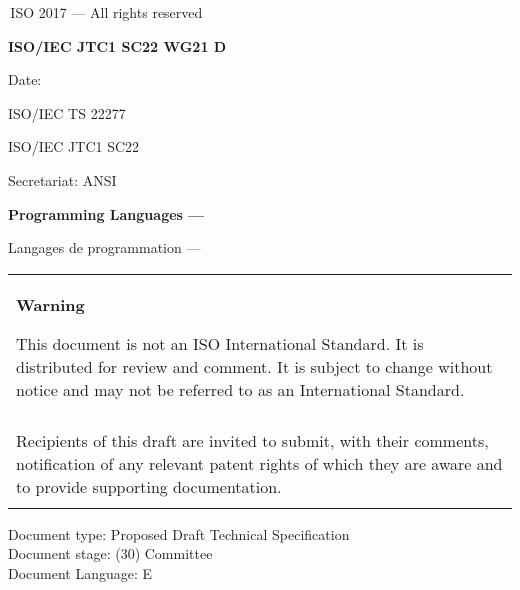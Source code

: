

\thispagestyle{empty}
{\raisebox{.35ex}{\smaller\copyright}}\,ISO 2017 --- All rights reserved
\vspace{2ex}

\begin{flushright}
	\textbf{ISO/IEC JTC1 SC22 WG21 D\,\LARGE\docno} %
	
	Date: \reldate
	
	ISO/IEC TS 22277
	
	ISO/IEC JTC1 SC22
	
	Secretariat: ANSI
	
\end{flushright}

\vfill

\textbf{\LARGE Programming Languages --- \doctitle}

Langages de programmation --- \frtitle

\vfill

\begin{tabular}{|p{\hsize}|}
	\hline
	\begin{center}
		\textbf{Warning}
	\end{center}
	
	\vspace{2ex}
	
	This document is not an ISO International Standard. It is distributed
	for review and comment. It is subject to change without notice and may
	not be referred to as an International Standard.\\\\
	
	Recipients of this draft are invited to submit, with their comments,
	notification of any relevant patent rights of which they are aware
	and to provide supporting documentation.\\\\
	\hline
\end{tabular}

\vfill
\noindent
Document type: Proposed Draft Technical Specification\\
Document stage: (30) Committee\\
Document Language: E
\pagebreak

\thispagestyle{cpppage}

